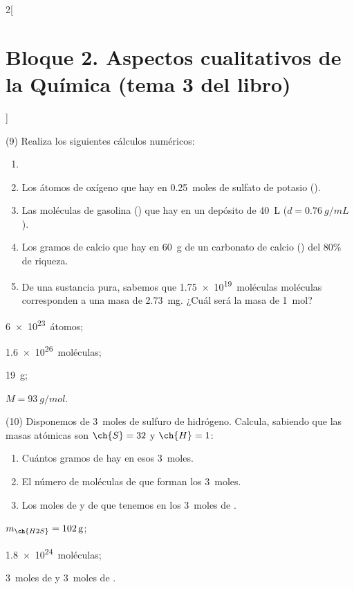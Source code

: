 \documentclass[10pt]{article}
\begin{document}
\begin{multicols}{2}[
    \section{Bloque 2. Aspectos cualitativos de la Química (tema 3 del libro)}
  ]
\begin{exercise}[
    tags    = {},
    topics  = {química,química básica},
    source  = {FQ 1B MGH 2016, p83, e9},
  ]
  (9) Realiza los siguientes cálculos numéricos:
  \begin{enumerate}
    \item
    \item Los átomos de oxígeno que hay en \SI{0.25}{moles} de sulfato
    de potasio ().
    \item Las moléculas de gasolina () que hay en un depósito
    de \SI{40}{\liter} (\( d = \SI{0.76}{g/mL} \)).
    \item Los gramos de calcio que hay en \SI{60}{g} de un carbonato de
    calcio () del 80\% de riqueza.
    \item De una sustancia pura, sabemos que \SI{1.75e19}{moléculas} moléculas
    corresponden a una masa de \SI{2.73}{mg}. ¿Cuál será la masa de \SI{1}{mol}?
  \end{enumerate}
\end{exercise}

\begin{solution}
  \begin{enumerate*}
    \item \SI{6e23}{átomos}; \item \SI{1.6e26}{moléculas}; \item \SI{19}{g}; \item \( M = \SI{93}{g/mol} \).
  \end{enumerate*}
\end{solution}




\begin{exercise}[
    tags    = {},
    topics  = {química,química básica},
    source  = {FQ 1B MGH 2016, p83, e10},
  ]
  (10) Disponemos de \SI{3}{moles} de sulfuro de hidrógeno. Calcula,
  sabiendo que las masas atómicas son \( \ch{S} = 32 \) y \( \ch{H} = 1 \):
  \begin{enumerate}
    \item Cuántos gramos de  hay en esos \SI{3}{moles}.
    \item El número de moléculas de  que forman los \SI{3}{moles}.
    \item Los moles de  y de  que tenemos en los \SI{3}{moles} de .
  \end{enumerate}
\end{exercise}

\begin{solution}
  \begin{enumerate*}
    \item \( m_{\ch{H2S}} = \SI{102}{\gram} \);
    \item \SI{1.8e24}{moléculas};
    \item \SI{3}{moles} de  y \SI{3}{moles} de .
  \end{enumerate*}
\end{solution}





\end{multicols}
\end{document}
